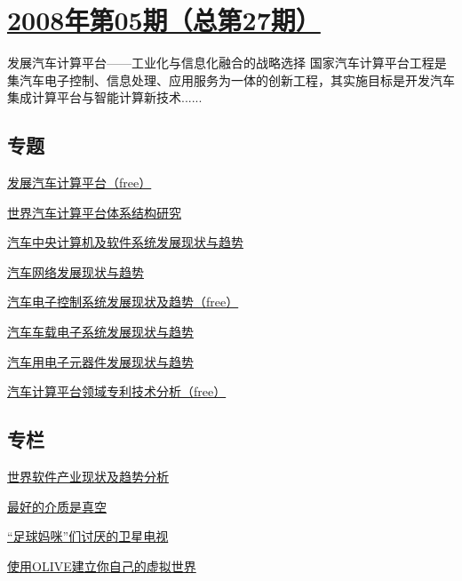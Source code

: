 \documentclass[a4paper]{article}
\begin{document}
\section{\href{http://history.ccf.org.cn/sites/ccf/jsjtbbd.jsp?contentId=2542567628998}{\textbf{2008年第05期（总第27期）}}}
发展汽车计算平台——工业化与信息化融合的战略选择 国家汽车计算平台工程是集汽车电子控制、信息处理、应用服务为一体的创新工程，其实施目标是开发汽车集成计算平台与智能计算新技术......
\subsection{专题}
\href{http://history.ccf.org.cn/resources/1190201776262/2010/04/15/027012.pdf}{发展汽车计算平台（free）}

\href{http://history.ccf.org.cn/resources/1190201776262/2010/04/15/027014.pdf}{世界汽车计算平台体系结构研究}

\href{http://history.ccf.org.cn/resources/1190201776262/2010/04/15/027022.pdf}{汽车中央计算机及软件系统发展现状与趋势}

\href{http://history.ccf.org.cn/resources/1190201776262/2010/04/15/027027.pdf}{汽车网络发展现状与趋势}

\href{http://history.ccf.org.cn/resources/1190201776262/2010/04/15/027033.pdf}{汽车电子控制系统发展现状及趋势（free）}

\href{http://history.ccf.org.cn/resources/1190201776262/2010/04/15/027038.pdf}{汽车车载电子系统发展现状与趋势}

\href{http://history.ccf.org.cn/resources/1190201776262/2010/04/15/027042.pdf}{汽车用电子元器件发展现状与趋势}

\href{http://history.ccf.org.cn/resources/1190201776262/2010/04/15/027046.pdf}{汽车计算平台领域专利技术分析（free）}

\subsection{专栏}
\href{http://history.ccf.org.cn/resources/1190201776262/2010/04/15/027054.pdf}{世界软件产业现状及趋势分析}

\href{http://history.ccf.org.cn/resources/1190201776262/2010/04/15/027060.pdf}{最好的介质是真空}

\href{http://history.ccf.org.cn/resources/1190201776262/2010/04/15/027064.pdf}{“足球妈咪”们讨厌的卫星电视}

\href{http://history.ccf.org.cn/resources/1190201776262/2010/04/15/027066.pdf}{使用OLIVE建立你自己的虚拟世界}
\end{document}
